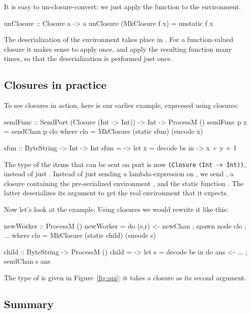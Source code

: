 \documentclass[preprint]{sigplanconf}
\begin{document}
It is easy to un-closure-convert: we just apply the function to the environment.
\begin{code}
  unClosure :: Closure a -> a
  unClosure (MkClosure f x) = unstatic f x
\end{code}
The deserialization of the environment takes place in .
For a function-valued closure it makes sense to apply  once, and
apply the resulting function many times, so that the deserialization is
performed just once.

\subsection{Closures in practice} 
\label{s:closures-in-practice}

To see closures in action, here is our earlier  example, 
expressed using closures:
\begin{code}
  sendFunc :: SendPort (Closure (Int -> Int)) 
                              -> Int -> ProcessM ()
  sendFunc p x = sendChan p clo
    where clo = MkClosure (static sfun) (encode x)

  sfun :: ByteString -> Int -> Int
  sfun = \bs -> let x = decode bs 
                in \y -> x + y + 1
\end{code}
The type of the items that can be sent on port  is now \lstinline+(Closure+ \lstinline+(Int -> Int))+, instead of just .
Instead of just sending a lambda-expression on , we send , a
closure containing the pre-serialized environment ,
and the static function . The latter deserializes its
argument  to get the real environment  that it expects.

Now let's look at the  example.
Using closures we would rewrite it like this:
\begin{code}
  newWorker :: ProcessM ()
  newWorker = do { (s,r) <- newChan
                 ; spawn node clo
                 ; ... }
    where clo = MkClosure (static child) (encode s)

  child :: ByteString -> ProcessM ()
  child = \bs -> let s = decode bs
           		   in do { ans <- ...
               		     ; sendChan s ans }
\end{code}
The type of  is given in Figure~\ref{fig:api}; it takes
a closure as its second argument.

\subsection{Summary}
\end{document}
